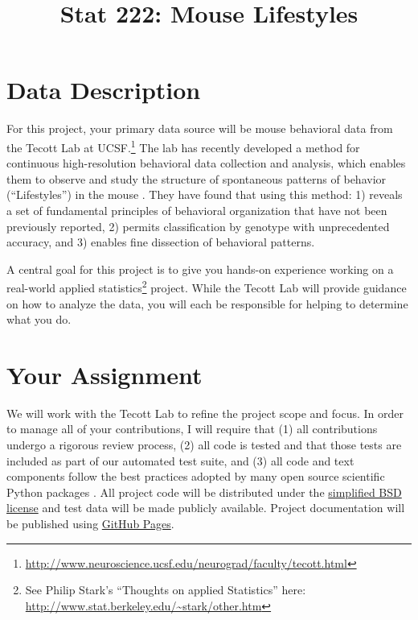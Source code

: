 \documentclass[11pt, oneside]{article}   	%
\title{Stat 222: Mouse Lifestyles}
\begin{document}
\maketitle

\section{Data Description}

For this project, your primary data source will be mouse behavioral data from
the Tecott Lab at
UCSF.\footnote{\url{http://www.neuroscience.ucsf.edu/neurograd/faculty/tecott.html}}
The lab has recently developed a method for continuous high-resolution
behavioral data collection and analysis, which enables them to observe and
study the structure of spontaneous patterns of behavior (``Lifestyles'') in the
mouse \cite{tecott2003genes, tecott2004neurobehavioral, goulding2008robust,
anderson2014toward}.  They have found that using this method: 1) reveals a set
of fundamental principles of behavioral organization that have not been
previously reported, 2) permits classification by genotype with unprecedented
accuracy, and 3) enables fine dissection of behavioral patterns.

A central goal for this project is to give you hands-on experience working on
a real-world applied statistics\footnote{See Philip Stark's ``Thoughts on applied
Statistics'' here: \url{http://www.stat.berkeley.edu/~stark/other.htm}}
project.  While the Tecott Lab will provide guidance on how to analyze the
data, you will each be responsible for helping to determine what you do.

\section{Your Assignment}

We will work with the Tecott Lab to refine the project scope and focus.  In
order to manage all of your contributions, I will require that (1) all
contributions undergo a rigorous review process, (2) all code is tested and
that those tests are included as part of our automated test suite, and (3) all
code and text components follow the best practices adopted by many open source
scientific Python packages \cite{millman2014developing}.  All project code will
be distributed under the
\href{https://en.wikipedia.org/wiki/BSD_licenses\#2-clause_license_.28.22Simplified_BSD_License.22_or_.22FreeBSD_License.22.29}{simplified
BSD license} and test data will be made publicly available.  Project
documentation will be published using \href{https://pages.github.com/}{GitHub
Pages}.
\end{document}
